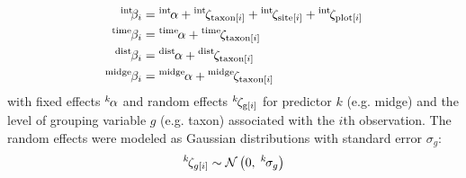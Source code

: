 \begin{equation} \label{eq:betas}
\begin{split}
    {}^\text{int}\hspace*{-2pt}\beta_i &= {}^\text{int}\hspace*{-1pt}\alpha +
        {}^\text{int}\hspace*{-1pt}\zeta_{\text{taxon}[i]} +
        {}^\text{int}\hspace*{-1pt}\zeta_{\text{site}[i]} +
        {}^\text{int}\hspace*{-1pt}\zeta_{\text{plot}[i]} \\
    {}^\text{time}\hspace*{-1pt}\beta_i &= {}^\text{time}\hspace*{-1pt}\alpha +
            {}^\text{time}\hspace*{-1pt}\zeta_{\text{taxon}[i]} \\
    {}^\text{dist}\hspace*{-1pt}\beta_i &= {}^\text{dist}\hspace*{-1pt}\alpha +
            {}^\text{dist}\hspace*{-1pt}\zeta_{\text{taxon}[i]} \\
    {}^\text{midge}\hspace*{-1pt}\beta_i &= {}^\text{midge}\hspace*{-1pt}\alpha +
            {}^\text{midge}\hspace*{-1pt}\zeta_{\text{taxon}[i]}
\end{split}
\end{equation}
%
\noindent with fixed effects ${}^k\hspace*{-1pt}\alpha$ and random effects
${}^k\hspace*{-1pt}\zeta_{\text{g}[i]}$ for predictor $k$ (e.g. midge)
and the level of grouping variable $g$ (e.g. taxon) associated  with the $i$th observation.
The random effects were modeled as Gaussian distributions with
standard error $\sigma_g$:
%
\begin{equation} \label{eq:zetas}
    {}^k\hspace*{-1pt}\zeta_{g[i]} \sim
        \mathcal{N}\left(0, \; {}^k\hspace*{-1pt}\sigma_g \right)
\end{equation}



